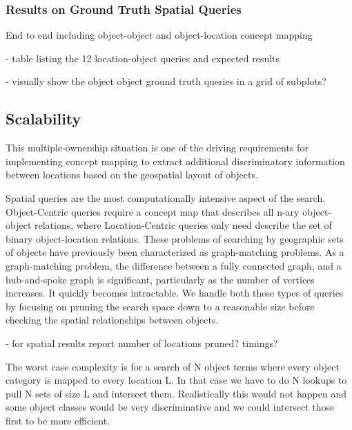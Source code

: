 \subsubsection{Results on Ground Truth Spatial Queries}
End to end including object-object and object-location concept mapping


- table listing the 12 location-object queries and expected results

- visually show the object object ground truth queries in a grid of subplots?




\subsection{Scalability}

This multiple-ownership situation is one of the driving requirements for implementing concept mapping to extract additional discriminatory information between locations based on the geospatial layout of objects.

Spatial queries are the most computationally intensive aspect of the search.
Object-Centric queries require a concept map that describes all n-ary object-object relations, where Location-Centric queries only need describe the set of binary object-location relations.
These problems of searching by geographic sets of objects have previously been characterized as graph-matching problems. 
As a graph-matching problem, the difference between a fully connected graph, and a hub-and-spoke graph is significant, particularly as the number of vertices increases. It quickly becomes intractable. 
We handle both these types of queries by focusing on pruning the search space down to a reasonable size before checking the spatial relationships between objects.

- for spatial results report number of locations pruned? timings?


The worst case complexity is for a search of N object terms where every object category is mapped to every location L. In that case we have to do N lookups to pull N sets of size L and intersect them. Realistically this would not happen and some object classes would be very discriminative and we could intersect those first to be more efficient.




